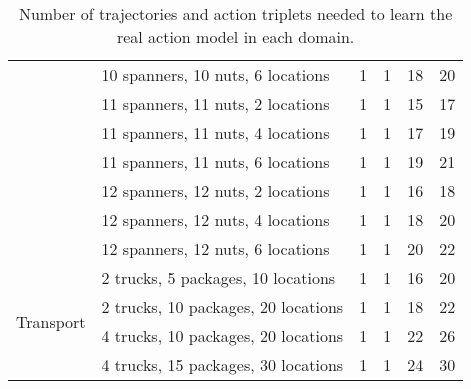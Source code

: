 \documentclass{article}
\begin{document}
\begin{table}[bt!]
{\begin{tabular}{ll|cc|cc}
                                & 10 spanners, 10 nuts, 6 locations & 1                       & 1                        & 18                      & 20                       \\
                                & 11 spanners, 11 nuts, 2 locations & 1                       & 1                        & 15                      & 17                       \\
                                & 11 spanners, 11 nuts, 4 locations & 1                       & 1                        & 17                      & 19                       \\
                                & 11 spanners, 11 nuts, 6 locations & 1                       & 1                        & 19                      & 21                       \\
                                & 12 spanners, 12 nuts, 2 locations & 1                       & 1                        & 16                      & 18                       \\
                                & 12 spanners, 12 nuts, 4 locations & 1                       & 1                        & 18                      & 20                       \\
                                & 12 spanners, 12 nuts, 6 locations & 1                       & 1                        & 20                      & 22                       \\ \midrule
\multirow{4}{*}{Transport}     & 2 trucks, 5 packages, 10 locations                      & 1                       & 1                        & 16                       & 20                        \\
                                & 2 trucks, 10 packages, 20 locations                     & 1                       & 1                        & 18                       & 22                        \\
                                & 4 trucks, 10 packages, 20 locations                      & 1                       & 1                        & 22                       & 26                        \\
                                & 4 trucks, 15 packages, 30 locations                    & 1                       & 1                        & 24                       & 30                       \\ \bottomrule
\end{tabular}
}
\caption{Number of trajectories and action triplets needed to learn the real action model in each domain.} 
\label{tab:all_experiments}
\end{table}
\end{document}
